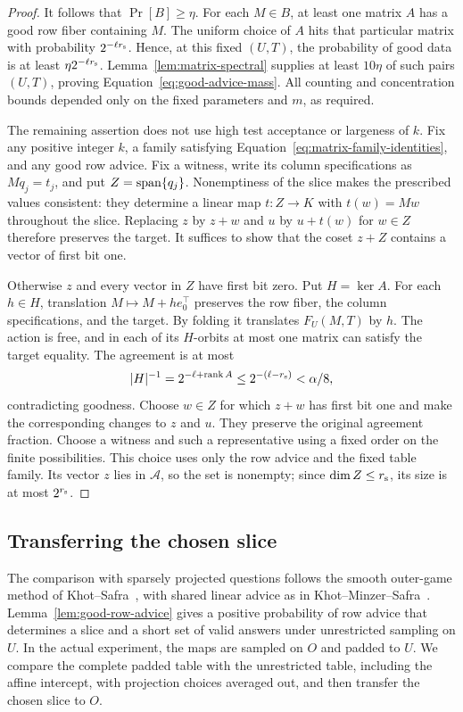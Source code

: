 \begin{proof}
It follows that $\Pr[B]\ge\eta$.  For each $M\in B$, at least one
matrix $A$ has a good row fiber containing $M$.  The uniform choice of $A$
hits that particular matrix with probability $2^{-\ell r_{\rm s}}$.
Hence, at this fixed $(U,T)$, the probability of good data is at least
$\eta2^{-\ell r_{\rm s}}$.  Lemma~\ref{lem:matrix-spectral} supplies
at least $10\eta$ of such pairs $(U,T)$, proving
Equation~\eqref{eq:good-advice-mass}.  All counting and concentration
bounds depended only on the fixed parameters and $m$, as required.

The remaining assertion does not use high test acceptance or largeness of
$k$.  Fix any positive integer $k$, a family satisfying
Equation~\eqref{eq:matrix-family-identities}, and any good row advice.
Fix a witness, write its column specifications as $Mq_j=t_j$, and put
$Z=\operatorname{span}\{q_j\}$.  Nonemptiness of the slice makes the prescribed values
consistent: they determine a linear map $t:Z\to K$ with $t(w)=Mw$
throughout the slice.  Replacing $z$ by $z+w$ and $u$ by $u+t(w)$ for
$w\in Z$ therefore preserves the target.  It suffices to show that the
coset $z+Z$ contains a vector of first bit one.

Otherwise $z$ and every vector in $Z$ have first bit zero.  Put $H=\ker A$.
For each $h\in H$, translation $M\mapsto M+h e_0^\top$ preserves the
row fiber, the column specifications, and the target.  By folding it
translates $F_U(M,T)$ by $h$.  The action is free, and in each of its
$H$-orbits at most one matrix can satisfy the target equality.  The
agreement is at most
\[
 |H|^{-1}=2^{-\ell+\operatorname{rank} A}
 \le2^{-(\ell-r_{\rm s})}<\alpha/8,
\]
contradicting goodness.  Choose $w\in Z$ for which $z+w$ has first bit one
and make the corresponding changes to $z$ and $u$.  They preserve the
original agreement fraction.  Choose a witness and such a representative
using a fixed order on the finite possibilities.  This choice uses only
the row advice and the fixed table family.  Its vector $z$ lies in
$\mathcal A$, so the set is nonempty; since $\dim Z\le r_{\rm s}$,
its size is at most $2^{r_{\rm s}}$.
\end{proof}

\subsection{Transferring the chosen slice}

The comparison with sparsely projected questions follows the smooth
outer-game method of Khot--Safra~\cite[Section~3 and Lemma~3.1]{KS13},
with shared linear advice as in Khot--Minzer--Safra~\cite[Sections~3.3--3.4]{KMS17}.
Lemma~\ref{lem:good-row-advice} gives a positive probability of row advice
that determines a slice and a short set of valid answers under unrestricted
sampling on $U$.  In the actual experiment, the maps are sampled on $O$
and padded to $U$.  We compare the complete padded table with the
unrestricted table, including the affine intercept, with projection choices
averaged out, and then transfer the chosen slice to $O$.


